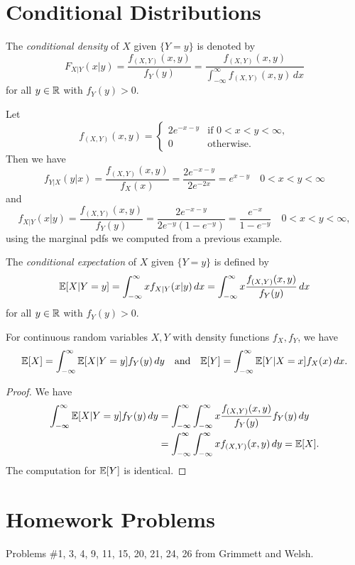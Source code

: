 \section{Conditional Distributions}

\begin{definition}
  The \emph{conditional density} of $X$ given
  $\{Y = y\}$ is denoted by
  \[
    F_{X | Y}(x | y) = \frac{f_{(X, Y)}(x, y)}{f_Y(y)}
    = \frac{f_{(X, Y)}(x, y)}{\displaystyle \int_{-\infty}^\infty f_{(X, Y)}(x, y) \, dx}
  \]
   for all $y \in \mathbb{R}$ with $f_Y(y) > 0$.
\end{definition}

\begin{example}
  Let
  \[
    f_{(X, Y)}(x, y) =
    \begin{cases}
      2e^{-x - y} & \text{if $0 < x < y < \infty$}, \\
      0 & \text{otherwise}.
    \end{cases}
  \]
  Then we have
  \[
    f_{Y | X}(y | x)
    = \frac{f_{(X, Y)}(x, y)}{f_X(x)}
    = \frac{2e^{-x - y}}{2e^{-2x}} = e^{x - y}
    \quad \text{$0 < x < y < \infty$}
  \]
  and
  \[
    f_{X | Y}(x | y) = \frac{f_{(X, Y)}(x, y)}{f_Y(y)}
    = \frac{2e^{-x - y}}{2e^{-y}(1 - e^{-y})}
    = \frac{e^{-x}}{1 - e^{-y}} \quad \text{$0 < x < y < \infty$},
  \]
  using the marginal pdfs we computed from a previous
  example.
\end{example}

\begin{definition}
  The \emph{conditional expectation} of $X$ given
  $\{Y = y\}$ is defined by
  \[
    \mathbb{E}[X | Y = y]
    = \int_{-\infty}^\infty x f_{X | Y}(x | y) \, dx
    = \int_{-\infty}^\infty x \frac{f_{(X, Y)}(x, y)}{f_Y(y)} \, dx
  \]
  for all $y \in \mathbb{R}$ with $f_Y(y) > 0$.
\end{definition}

\begin{prop}
  For continuous random variables $X, Y$ with
  density functions $f_X, f_Y$, we have
  \[
    \mathbb{E}[X] =
    \int_{-\infty}^\infty \mathbb{E}[X | Y = y] f_Y(y) \, dy
    \quad \text{and} \quad
    \mathbb{E}[Y] =
    \int_{-\infty}^\infty \mathbb{E}[Y | X = x] f_X(x) \, dx.
  \]
\end{prop}

\begin{proof}
  We have
  \begin{align*}
    \int_{-\infty}^\infty \mathbb{E}[X | Y = y] f_Y(y) \, dy
    &= \int_{-\infty}^\infty \int_{-\infty}^\infty x \frac{f_{(X, Y)}(x, y)}{f_Y(y)} f_Y(y) \, dy \\
    &= \int_{-\infty}^\infty \int_{-\infty}^\infty x f_{(X, Y)}(x, y) \, dy = \mathbb{E}[X].
  \end{align*}
  The computation for $\mathbb{E}[Y]$ is identical.
\end{proof}

\section{Homework Problems}
Problems \#1, 3, 4, 9, 11, 15, 20, 21, 24, 26
from Grimmett and Welsh.
